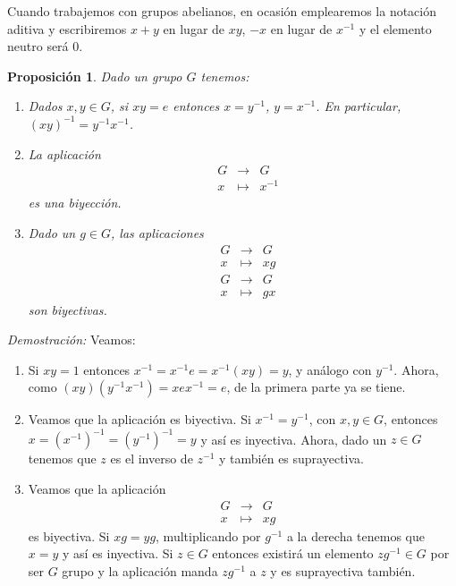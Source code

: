 \documentclass[12pt]{article}
\newtheorem{proposition}[theorem]{Proposición}
\begin{document}
Cuando trabajemos con grupos abelianos, en ocasión emplearemos la notación aditiva y escribiremos $x+y$ en lugar de $xy$, $-x$ en lugar de $x^{-1}$ y el elemento neutro será $0$.

\begin{proposition}\label{eq:primGrup} Dado un grupo $G$ tenemos:
\begin{enumerate}
\item Dados $x,y \in G$, si $xy = e$ entonces $x = y^{-1}$, $y = x^{-1}$. En particular, $(xy)^{-1} = y^{-1}x^{-1}$.
\item La aplicación $$\begin{array}{rccl}
&G&\longrightarrow &G\\
&x& \longmapsto &x^{-1}
\end{array}
$$ es una biyección.
\item Dado un $g \in G$, las aplicaciones $$\begin{array}{rccl}
&G&\longrightarrow &G\\
&x& \longmapsto &xg
\end{array}
$$
$$\begin{array}{rccl}
&G&\longrightarrow &G\\
&x& \longmapsto &gx
\end{array}
$$ son biyectivas.
\end{enumerate}
\end{proposition}
\emph{Demostración: }Veamos: \begin{enumerate}
\item Si $xy = 1$ entonces $x^{-1} = x^{-1}e= x^{-1}(xy) = y$, y análogo con $y^{-1}$. Ahora, como $(xy) (y^{-1}x^{-1})=xex^{-1} = e$, de la primera parte ya se tiene.
\item Veamos que la aplicación es biyectiva. Si $x^{-1} = y^{-1}$, con $x,y \in G$, entonces $x = (x^{-1})^{-1} = (y^{-1})^{-1}=y$ y así es inyectiva. Ahora, dado un $z \in G$ tenemos que $z$ es el inverso de $z^{-1}$ y también es suprayectiva.
\item Veamos que la aplicación $$\begin{array}{rccl}
&G&\longrightarrow &G\\
&x& \longmapsto &xg
\end{array}
$$ es biyectiva. Si $xg = yg$, multiplicando por $g^{-1}$ a la derecha tenemos que $x = y$ y así es inyectiva. Si $z \in G$ entonces existirá un elemento $zg^{-1} \in G$ por ser $G$ grupo y la aplicación manda $zg^{-1}$ a $z$ y es suprayectiva también.
\end{enumerate}
\end{document}
